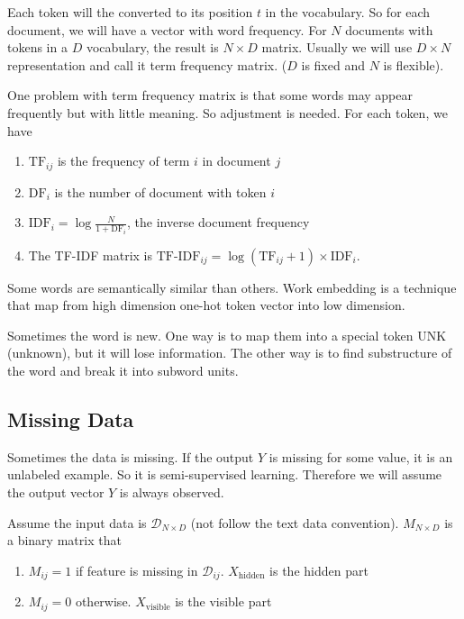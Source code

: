 \begin{definition}
    Each token will the converted to its position $t$ in the vocabulary. So for each document, we will have a vector with word frequency. For $N$ documents with tokens in a $D$ vocabulary, the result is $N \times D$ matrix. Usually we will use $D \times N$ representation and call it term frequency matrix. ($D$ is fixed and $N$ is flexible).
    
    
One problem with term frequency matrix is that some words may appear frequently but with little meaning. So adjustment is needed. For each token, we have
\begin{enumerate}
    \item $\text{TF}_{ij}$ is the frequency of term $i$ in document $j$
    \item $\text{DF}_i$ is the number of document with token $i$
    \item $\displaystyle \text{IDF}_i = \log \frac{N}{1 + \text{DF}_i}$, the inverse document frequency
    \item The TF-IDF matrix is $\text{TF-IDF}_{ij} = \log(\text{TF}_{ij} + 1) \times \text{IDF}_i$.
\end{enumerate}

\end{definition}

\begin{definition}
    Some words are semantically similar than others. Work embedding is a technique that map from high dimension one-hot token vector into low dimension.
\end{definition}

\begin{example}
    Sometimes the word is new. One way is to map them into a special token UNK (unknown), but it will lose information. The other way is to find substructure of the word and break it into subword units.
\end{example}



\subsection{Missing Data}

Sometimes the data is missing. If the output $Y$ is missing for some value, it is an unlabeled example. So it is semi-supervised learning. Therefore we will assume the output vector $Y$ is always observed.

Assume the input data is $\mathcal{D}_{N \times D}$ (not follow the text data convention). $M_{N \times D}$ is a binary matrix that
\begin{enumerate}
    \item $M_{ij} = 1$ if feature is missing in $\mathcal{D}_{ij}$. $X_{\text{hidden}}$ is the hidden part
    \item $M_{ij} = 0$ otherwise. $X_{\text{visible}}$ is the visible part
\end{enumerate}

